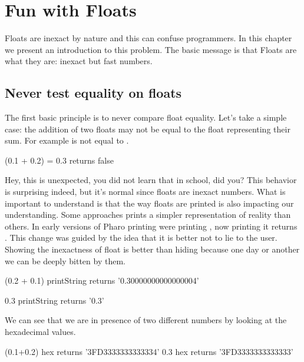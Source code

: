 \documentclass[a4paper,10pt,twoside]{book}
\begin{document}
\fi
\sloppy

\chapter{Fun with Floats}
\chapterauthor{\authornicolas{}}

Floats are inexact by nature and this can confuse programmers. In this chapter we present 
an introduction to this problem. The basic message is that Floats are what they are: inexact but fast numbers.


\section{Never test equality on floats}
The first basic principle is to never compare float equality. 
Let's take a simple case: the addition of two floats may not be equal to the float representing their
sum. For example  is not equal to .

\begin{code}{}
(0.1 + 0.2) = 0.3
	returns false
\end{code}

Hey, this is unexpected, you did not learn that in school, did you? This behavior is surprising indeed, but it's normal since floats are inexact numbers. What is important to understand is that the way floats are printed is also impacting our understanding. Some approaches prints a simpler representation of reality than others. In early versions of Pharo printing  were printing , now  printing it returns .
This change was guided by the idea that it is better not to lie to the user. Showing the inexactness of float is better than hiding because one day or another we can be deeply bitten by them. 

\begin{code}{}
(0.2 + 0.1) printString
	returns '0.30000000000000004' 

0.3 printString
	returns	'0.3'
\end{code}	

We can see that we are in presence of two different numbers by looking at the hexadecimal values. 

\begin{code}{}
(0.1+0.2) hex 
	returns '3FD3333333333334'
0.3 hex 
	returns '3FD3333333333333' 
\end{code}
\end{document}
